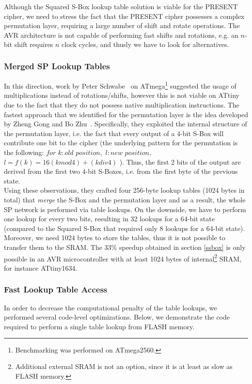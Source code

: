 \documentclass{llncs}
\begin{document}
Although the Squared S-Box lookup table solution is viable for the PRESENT cipher, we need to stress the fact that the PRESENT cipher possesses a complex permutation layer, requiring a large number of shift and rotate operations. The AVR architecture is not capable of performing fast shifts and rotations,  e.g. an $n$-bit shift requires $n$ clock cycles, and thusly we have to look for alternatives.
\subsubsection{Merged SP Lookup Tables}\label{msbox}
In this direction, work by Peter Schwabe~\cite{hutternacl} on ATmega\footnote{Benchmarking was performed on ATmega2560.} suggested the usage of multiplications instead of rotations/shifts, however this is not viable on ATtiny due to the fact that they do not possess native multiplication instructions. The fastest approach that we identified for the permutation layer is the idea developed by Zheng Gong and Bo Zhu~\cite{gong_code,gong2009towards}. Specifically, they exploited the internal structure of the permutation layer, i.e. the fact that every output of a 4-bit S-Box will contribute one bit to the cipher (the underlying pattern for the permutation is the following: $for$ $k:old$ $position,$ $l:new$ $position,$ $l=f(k)=16(k mod 4)+(k div 4)$ ). Thus, the first 2 bits of the output are derived from the first two 4-bit S-Boxes, i.e. from the first byte of the previous state. \\
Using these observations, they crafted four 256-byte lookup tables (1024 bytes in total) that \emph{merge} the S-Box and the permutation layer and as a result, the whole SP network is performed via table lookups. On the downside, we have to perform one lookup for every two bits, resulting in 32 lookups for a 64-bit state (compared to the Squared S-Box that required only 8 lookups for a 64-bit state). Moreover, we need 1024 bytes to store the tables, thus it is not possible to transfer them to the SRAM. The 33\% speedup obtained in section \ref{ssbox} is only possible in an AVR microcontroller with at least 1024 bytes of internal\footnote{Additional external SRAM is not an option, since it is at least as slow as FLASH memory.} SRAM, for instance ATtiny1634.

\subsubsection{Fast Lookup Table Access}
In order to decrease the computational penalty of the table lookups, we performed several code-level optimizations. Below, we demonstrate the code required to perform a single table lookup from FLASH memory.
\end{document}
